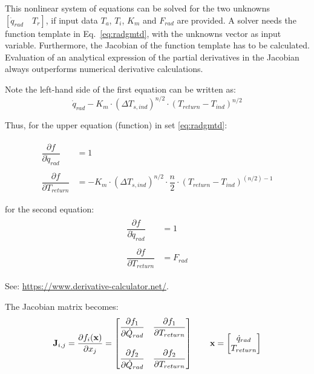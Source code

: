 This nonlinear system of equations can be solved for the two unknowns $[\dot{q}_{rad} \quad T_{r}]$, if input data $T_{a}$, $ T_{i}$, $K_m$ and $F_{rad}$ are provided. A solver needs the function template in Eq.~\ref{eq:radgmtd}, with the unknowns vector as input variable. Furthermore, the Jacobian of the function template has to be calculated. Evaluation of an analytical expression of the partial derivatives in the Jacobian always outperforms numerical derivative calculations. 

Note the left-hand side of the first equation can be written as:
$$ \dot{q}_{rad} - K_{m} \cdot \left(\Delta T_{s,ind}\right)^{n/2} \cdot \left(T_{return} - T_{ind}\right)^{n/2} $$

Thus, for the upper equation (function) in set \ref{eq:radgmtd}:

\begin{equation}
	\begin{aligned}
		\begin{matrix}
			\dfrac{\partial f}{\partial \dot{q}_{rad}} &= 1 \\ 
			\\
			\dfrac{\partial f}{\partial T_{return}} &= - K_{m} \cdot \left(\Delta T_{s,ind}\right)^{n/2} \cdot \dfrac{n}{2} \cdot \left(T_{return} - T_{ind}\right)^{(n/2)-1} \\ \\
		\end{matrix}
	\end{aligned}
\end{equation} 
for the second equation:
\begin{equation}
	\begin{aligned}
		\begin{matrix}
			\dfrac{\partial f}{\partial \dot{q}_{rad}} &= 1 \\ \\
			\dfrac{\partial f}{\partial T_{return}} &= F_{rad}
		\end{matrix}
	\end{aligned}
\end{equation} 

See: \url{https://www.derivative-calculator.net/}.

The Jacobian matrix becomes:
\begin{equation}
	\begin{aligned}
		\mathbf{J}_{i,j}=\dfrac{\partial f_{i}(\mathbf{x})}{\partial x_{j}} =
		\begin{bmatrix}
			\dfrac{\partial f_1}{\partial \dot{Q}_{rad}} & \dfrac{\partial f_1}{\partial T_{return}} \\ 
			\vspace{2pt} \\
			\dfrac{\partial f_2}{\partial \dot{Q}_{rad}} & \dfrac{\partial f_2}{\partial T_{return}}
		\end{bmatrix}
	    \qquad
	    \mathbf{x} =
	    \begin{bmatrix}
	    	\dot{q}_{rad} \\ 
	    	T_{return}
	    \end{bmatrix}
	\end{aligned}
\end{equation} 


